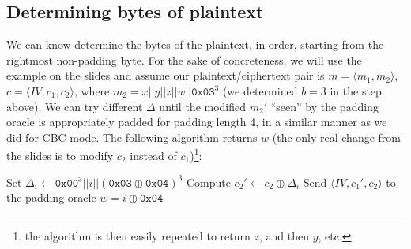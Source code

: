 \documentclass[12pt]{article}
\numberwithin{equation}{section}
\theoremstyle{plain}
\newcommand{\set}[1]{\{ #1 \}}
\begin{document}
\subsection*{Determining bytes of plaintext}

We can know determine the bytes of the plaintext,
in order,
starting from the rightmost non-padding byte.
For the sake of concreteness,
we will use the example on the slides and assume our plaintext/ciphertext pair is
$m = \langle m_1, m_2 \rangle$,
$c = \langle IV, c_1, c_2 \rangle$,
where $m_2 = x || y || z || w || \texttt{0x03}^3$
(we determined $b = 3$ in the step above).
We can try different $\Delta$ until the modified $m_2'$ ``seen'' by the padding oracle is appropriately padded for padding length 4,
in a similar manner as we did for CBC mode.
The following algorithm returns $w$
(the only real change from the slides is to modify $c_2$ instead of $c_1$)\footnote{the algorithm is then easily repeated to return $z$, and then $y$, etc.}:
\begin{algorithm}[H]
\begin{algorithmic}
    \For{$i \in \set{ 0, 1 }^8$}
        \State Set $\Delta_i \gets \texttt{0x00}^3 || i || (\texttt{0x03} \oplus \texttt{0x04})^3$
        \State Compute $c_2' \gets c_2 \oplus \Delta_i$
        \State Send $\langle IV, c_1', c_2 \rangle$ to the padding oracle
            \State \Return $w = i \oplus \texttt{0x04}$
        \EndIf
    \EndFor
\EndProcedure
\end{algorithmic}
\end{algorithm}
\end{document}
